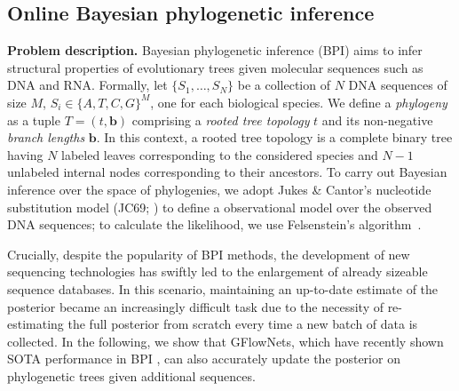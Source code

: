 \documentclass{article}
\newcommand{\pp}[1]{\vspace{0pt}\noindent\textbf{#1}}
\theoremstyle{plain}
\theoremstyle{definition}
\theoremstyle{remark}
\theoremstyle{remark}
\begin{document}

\subsection{Online Bayesian phylogenetic inference} \label{sec:exp:i} 
\renewcommand{\pp}[1]{\vspace{0pt}\noindent\textbf{#1}}

\pp{Problem description.} Bayesian phylogenetic inference (BPI) \cite{zhang2018variational, kviman2024improved} aims to infer structural properties of evolutionary trees given molecular sequences such as DNA and RNA. Formally, let $\{S_{1}, \dots, S_{N}\}$ be a collection of $N$ DNA sequences of size $M$, $S_{i} \in \{A, T, C, G\}^{M}$, one for each biological species. We define a \textit{phylogeny} as a tuple $T = (t, \mathbf{b})$ comprising a \textit{rooted tree topology} $t$ and its non-negative \textit{branch lengths} $\mathbf{b}$. In this context, a rooted tree topology is a complete binary tree having $N$ labeled leaves corresponding to the considered species and $N - 1$ unlabeled internal nodes corresponding to their ancestors. To carry out Bayesian inference over the space of phylogenies, we adopt Jukes \& Cantor's nucleotide substitution model (JC69; \cite{Jukes1969}) to define a observational model over the observed DNA sequences; to calculate the likelihood, we use Felsenstein's algorithm~\cite{Felsenstein1981}.  


Crucially, despite the popularity of BPI methods, the development of new sequencing technologies has swiftly led to the enlargement of already sizeable sequence databases. In this scenario, maintaining an up-to-date estimate of the posterior became an increasingly difficult task due to the necessity of re-estimating the full posterior from scratch every time a new batch of data is collected. In the following, we show that GFlowNets, which have recently shown SOTA performance in BPI \cite{zhou2024phylogfn}, can also accurately update the posterior on phylogenetic trees given additional sequences. 
\end{document}
